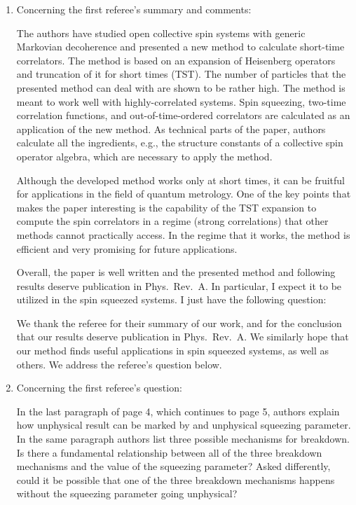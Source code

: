 \documentclass[preprint,superscriptaddress]{revtex4-2}
\newcommand{\1}{\mathds{1}}
\newcommand{\blue}[1]{{\color{blue} #1}}
\begin{document}
\begin{enumerate}
\item Concerning the first referee's summary and comments:

  \blue{The authors have studied open collective spin systems with
    generic Markovian decoherence and presented a new method to
    calculate short-time correlators. The method is based on an
    expansion of Heisenberg operators and truncation of it for short
    times (TST). The number of particles that the presented method can
    deal with are shown to be rather high. The method is meant to work
    well with highly-correlated systems. Spin squeezing, two-time
    correlation functions, and out-of-time-ordered correlators are
    calculated as an application of the new method. As technical parts
    of the paper, authors calculate all the ingredients, e.g., the
    structure constants of a collective spin operator algebra, which
    are necessary to apply the method.}

  \blue{Although the developed method works only at short times, it
    can be fruitful for applications in the field of quantum
    metrology. One of the key points that makes the paper interesting
    is the capability of the TST expansion to compute the spin
    correlators in a regime (strong correlations) that other methods
    cannot practically access. In the regime that it works, the method
    is efficient and very promising for future applications.}

  \blue{Overall, the paper is well written and the presented method
    and following results deserve publication in Phys.~Rev.~A. In
    particular, I expect it to be utilized in the spin squeezed
    systems. I just have the following question:}

  We thank the referee for their summary of our work, and for the
  conclusion that our results deserve publication in Phys.~Rev.~A.  We
  similarly hope that our method finds useful applications in spin
  squeezed systems, as well as others.  We address the referee's
  question below.


\item Concerning the first referee's question:

  \blue{In the last paragraph of page 4, which continues to page 5,
    authors explain how unphysical result can be marked by and
    unphysical squeezing parameter. In the same paragraph authors list
    three possible mechanisms for breakdown. Is there a fundamental
    relationship between all of the three breakdown mechanisms and the
    value of the squeezing parameter? Asked differently, could it be
    possible that one of the three breakdown mechanisms happens
    without the squeezing parameter going unphysical?}


\end{enumerate}
\end{document}
